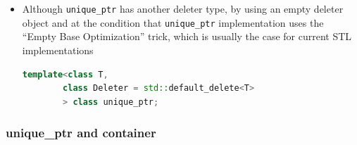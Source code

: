 \documentclass[a4paper,11pt,twoside]{book}
\begin{document}
\begin{itemize}
\item Although \texttt{unique\_ptr} has another deleter type, by using an empty deleter object and at the condition that \texttt{unique\_ptr} implementation uses the “Empty Base Optimization” trick, which is usually the case for current STL implementations
\begin{lstlisting}[frame=single, language=c++, mathescape=true]
template<class T, 
		class Deleter = std::default_delete<T>
		> class unique_ptr;
\end{lstlisting}

\end{itemize}

\subsubsection{unique\_ptr and container}
\end{document}
